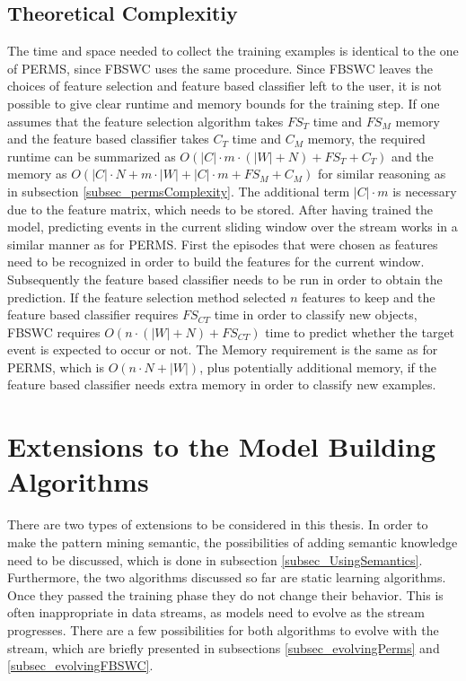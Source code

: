 \subsection{Theoretical Complexitiy}
The time and space needed to collect the training examples is identical to the one of PERMS, since FBSWC uses the same procedure.
Since FBSWC leaves the choices of feature selection and feature based classifier left to the user, it is not possible to give clear runtime and memory bounds for the training step. If one assumes that the feature selection algorithm takes $FS_T$ time and $FS_M$ memory and the feature based classifier takes $C_T$ time and $C_M$ memory, the required runtime can be summarized as $O(|C| \cdot m \cdot(|W| + N) + FS_T + C_T)$ and the memory as $O(|C|\cdot N + m \cdot |W| + |C|\cdot m + FS_M + C_M)$ for similar reasoning as in subsection \ref{subsec_permsComplexity}. The additional term $|C|\cdot m$ is necessary due to the feature matrix, which needs to be stored.
After having trained the model, predicting events in the current sliding window over the stream works in a similar manner as for PERMS. First the episodes that were chosen as features need to be recognized in order to build the features for the current window. Subsequently the feature based classifier needs to be run in order to obtain the prediction. If the feature selection method selected $n$ features to keep and the feature based classifier requires $FS_{CT}$ time in order to classify new objects, FBSWC requires $O(n \cdot (|W|+N) + FS_{CT})$ time to predict whether the target event is expected to occur or not. The Memory requirement is the same as for PERMS, which is $O(n \cdot N + |W|)$, plus potentially additional memory, if the feature based classifier needs extra memory in order to classify new examples.

\section{Extensions to the Model Building Algorithms}
\label{sec_EvolvingModels}

There are two types of extensions to be considered in this thesis. In order to make the pattern mining semantic, the possibilities of adding semantic knowledge need to be discussed, which is done in subsection \ref{subsec_UsingSemantics}. Furthermore, the two algorithms discussed so far are static learning algorithms. Once they passed the training phase they do not change their behavior. This is often inappropriate in data streams, as models need to evolve as the stream progresses. There are a few possibilities for both algorithms to evolve with the stream, which are briefly presented in subsections \ref{subsec_evolvingPerms} and \ref{subsec_evolvingFBSWC}.

